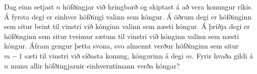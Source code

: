 Dag einn setjast $n$ höfðingjar við hringborð og skiptast á að vera konungur ríkis. Á fyrsta degi er einhver höfðingi valinn sem kóngur. Á öðrum degi er höfðinginn sem situr beint til vinstri við kónginn valinn sem næsti kóngur. Á þriðja degi er höfðinginn sem situr tveimur sætum til vinstri við kónginn valinn sem næsti kóngur. Áfram gengur þetta svona, svo almennt verður höfðinginn sem situr $m-1$ sæti til vinstri við síðasta konung, kóngurinn á degi $m$. Fyrir hvaða gildi á $n$ munu allir höfðingjarnir einhverntímann verða kóngar?
